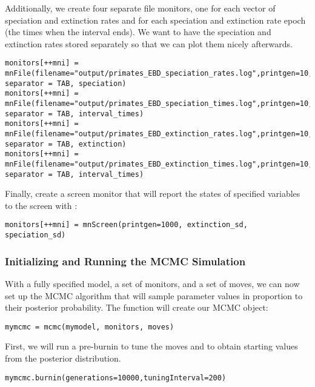 Additionally, we create four separate file monitors, one for each vector of speciation and extinction rates and for each speciation and extinction rate epoch (\IE the times when the interval ends).
We want to have the speciation and extinction rates stored separately so that we can plot them nicely afterwards.
{\tt \begin{snugshade*}
\begin{lstlisting}
monitors[++mni] = mnFile(filename="output/primates_EBD_speciation_rates.log",printgen=10, separator = TAB, speciation)
monitors[++mni] = mnFile(filename="output/primates_EBD_speciation_times.log",printgen=10, separator = TAB, interval_times)
monitors[++mni] = mnFile(filename="output/primates_EBD_extinction_rates.log",printgen=10, separator = TAB, extinction)
monitors[++mni] = mnFile(filename="output/primates_EBD_extinction_times.log",printgen=10, separator = TAB, interval_times)
\end{lstlisting}
\end{snugshade*}}

Finally, create a screen monitor that will report the states of specified variables to the screen with :
{\tt \begin{snugshade*}
\begin{lstlisting}
monitors[++mni] = mnScreen(printgen=1000, extinction_sd, speciation_sd)
\end{lstlisting}
\end{snugshade*}}

\subsubsection{Initializing and Running the MCMC Simulation}

With a fully specified model, a set of monitors, and a set of moves, we can now set up the MCMC algorithm that will sample parameter values in proportion to their posterior probability. The  function will create our MCMC object:
{\tt \begin{snugshade*}
\begin{lstlisting}
mymcmc = mcmc(mymodel, monitors, moves)
\end{lstlisting}
\end{snugshade*}}

First, we will run a pre-burnin to tune the moves and to obtain starting values from the posterior distribution.
{\tt \begin{snugshade*}
\begin{lstlisting}
mymcmc.burnin(generations=10000,tuningInterval=200)
\end{lstlisting}
\end{snugshade*}}


